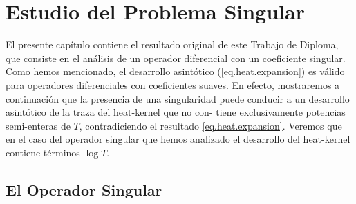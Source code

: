 \chapter{Estudio del Problema Singular}
{\label{cap.singular}}

El presente capítulo contiene el resultado original de este Trabajo de Diploma, que consiste en el análisis de un operador diferencial con un coeficiente singular. Como hemos mencionado, el desarrollo asintótico (\ref{eq.heat.expansion})
es válido para operadores diferenciales con coeficientes suaves. En efecto,
mostraremos a continuación que la presencia de una singularidad puede
conducir a un desarrollo asintótico de la traza del heat-kernel que no con-
tiene exclusivamente potencias semi-enteras de $T$, contradiciendo el resultado \eqref{eq.heat.expansion}. Veremos que
en el caso del operador singular que hemos analizado el desarrollo del heat-kernel contiene términos $\log T$.


\section{El Operador Singular}


